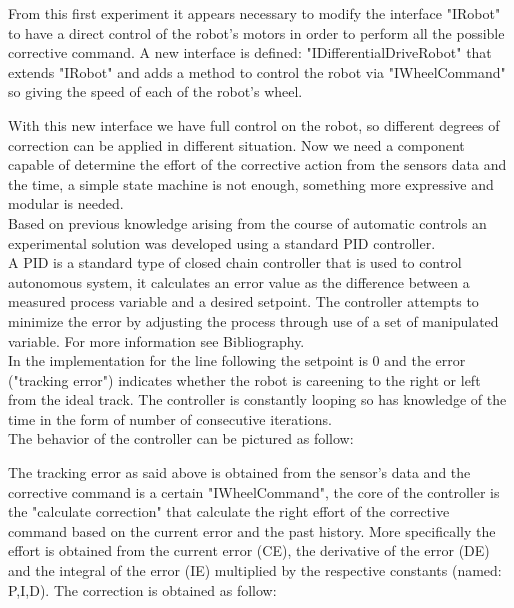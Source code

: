 \documentclass{llncs}
\begin{document}
From this first experiment it appears necessary to modify the interface "IRobot" to have a direct control of the robot's motors in order to perform all the possible corrective command. A new interface is defined: "IDifferentialDriveRobot" that extends "IRobot" and adds a method to control the robot via "IWheelCommand" so giving the speed of each of the robot's wheel.

\noindent With this new interface we  have full control on the robot, so different degrees of correction can be applied in different situation. Now we need a component capable of determine the effort of the corrective action from the sensors data and the time, a simple state machine is not enough, something more expressive and modular is needed.\\
Based on previous knowledge arising from the course of automatic controls an experimental solution was developed using a standard PID controller.\\
A PID is a standard type of closed chain controller that is used to control autonomous system, it calculates an error value as the difference between a measured process variable and a desired setpoint. The controller attempts to minimize the error by adjusting the process through use of a set of manipulated variable. For more information see Bibliography.\\
In the implementation for the line following the setpoint is 0 and the error ("tracking error") indicates whether the robot is careening to the right or left from the ideal track. The controller is constantly looping so has knowledge of the time in the form of number of consecutive iterations.\\
The behavior of the controller can be pictured as follow:
\begin{center}
\end{center}
\noindent The tracking error as said above is obtained from the sensor's data and the corrective command is a certain "IWheelCommand", the core of the controller is the "calculate correction" that calculate the right effort of the corrective command based on the current error and the past history. More specifically the effort is obtained from the current error (CE), the derivative of the error (DE) and the integral of the error (IE) multiplied by the respective constants (named: P,I,D). The correction is obtained as follow:\\
\end{document}
